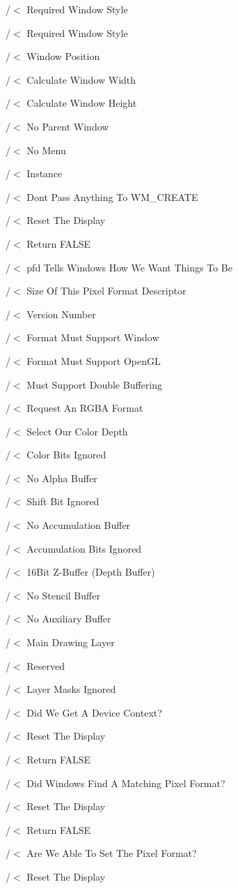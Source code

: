 /$<$ Required Window Style

/$<$ Required Window Style

/$<$ Window Position

/$<$ Calculate Window Width

/$<$ Calculate Window Height

/$<$ No Parent Window

/$<$ No Menu

/$<$ Instance

/$<$ Dont Pass Anything To W\+M\+\_\+\+C\+R\+E\+A\+TE

/$<$ Reset The Display

/$<$ Return F\+A\+L\+SE

/$<$ pfd Tells Windows How We Want Things To Be

/$<$ Size Of This Pixel Format Descriptor

/$<$ Version Number

/$<$ Format Must Support Window

/$<$ Format Must Support Open\+GL

/$<$ Must Support Double Buffering

/$<$ Request An R\+G\+BA Format

/$<$ Select Our Color Depth

/$<$ Color Bits Ignored

/$<$ No Alpha Buffer

/$<$ Shift Bit Ignored

/$<$ No Accumulation Buffer

/$<$ Accumulation Bits Ignored

/$<$ 16\+Bit Z-\/\+Buffer (Depth Buffer)

/$<$ No Stencil Buffer

/$<$ No Auxiliary Buffer

/$<$ Main Drawing Layer

/$<$ Reserved

/$<$ Layer Masks Ignored

/$<$ Did We Get A Device Context?

/$<$ Reset The Display

/$<$ Return F\+A\+L\+SE

/$<$ Did Windows Find A Matching Pixel Format?

/$<$ Reset The Display

/$<$ Return F\+A\+L\+SE

/$<$ Are We Able To Set The Pixel Format?

/$<$ Reset The Display

